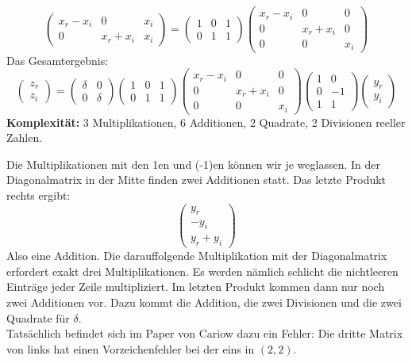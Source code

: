 \documentclass[10pt,fleqn]{article}
\theoremstyle{definition}
\theoremstyle{remark}
\begin{document}
\[
    \begin{pmatrix}
        x_r - x_i & 0 & x_i\\
        0 & x_r + x_i & x_i
    \end{pmatrix} = \begin{pmatrix}
        1 & 0 & 1\\
        0 & 1 & 1
    \end{pmatrix} \begin{pmatrix}
        x_r - x_i & 0 & 0\\
        0 & x_r + x_i & 0\\
        0 & 0 & x_i
    \end{pmatrix}
\]
Das Gesamtergebnis:
\[
    \begin{pmatrix}
        z_r\\
        z_i
    \end{pmatrix} = \begin{pmatrix}
        \delta & 0\\
        0 & \delta
    \end{pmatrix} \begin{pmatrix}
        1 & 0 & 1\\
        0 & 1 & 1
    \end{pmatrix} \begin{pmatrix}
        x_r - x_i & 0 & 0\\
        0 & x_r + x_i & 0\\
        0 & 0 & x_i
    \end{pmatrix} \begin{pmatrix}
        1 & 0\\
        0 & -1\\
        1 & 1
    \end{pmatrix} \begin{pmatrix}
        y_r\\
        y_i
    \end{pmatrix}
\]
\textbf{Komplexität:} 3 Multiplikationen, 6 Additionen, 2 Quadrate, 2 Divisionen reeller Zahlen.

Die Multiplikationen mit den 1en und (-1)en können wir je weglassen. In der Diagonalmatrix in der Mitte finden zwei Additionen statt. Das letzte Produkt rechts ergibt:
\[
    \begin{pmatrix}
        y_r\\
        -y_i\\
        y_r + y_i
    \end{pmatrix}
\]
Also eine Addition. Die darauffolgende Multiplikation mit der Diagonalmatrix erfordert exakt drei Multiplikationen. Es werden nämlich schlicht die nichtleeren Einträge jeder Zeile multipliziert. Im letzten Produkt kommen dann nur noch zwei Additionen vor. Dazu kommt die Addition, die zwei Divisionen und die zwei Quadrate für \(\delta\).\\

Tatsächlich befindet sich im Paper von Cariow dazu ein Fehler: Die dritte Matrix von links hat einen Vorzeichenfehler bei der eins in \((2, 2)\).
\end{document}
